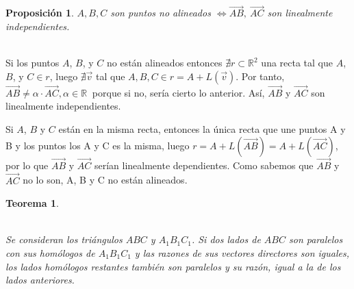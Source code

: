\documentclass[11pt, a4paper]{article}
\makeatletter
\newif\IfInSansMode
\let\oldsf\sffamily
\renewcommand*{\sffamily}{\oldsf\mathversion{sans}\InSansModetrue}
\let\oldnorm\normalfont
\renewcommand*{\normalfont}{\oldnorm\InSansModefalse\mathversion{normal}}
\renewenvironment{proof}[1][\proofname] {\vspace{-15pt}\par\pushQED{\qed}\normalfont\topsep6\p@\@plus6\p@\relax\trivlist\item[\hskip\labelsep\it#1\@addpunct{.}]\ignorespaces}{\popQED\endtrivlist\@endpefalse}
\renewcommand{\vec}{\overrightarrow}
\renewenvironment{proof}[1][\proofname] {\par\pushQED{\qed}\normalfont\topsep6\p@\@plus6\p@\relax\trivlist\item[\hskip\labelsep\itshape\sffamily#1\@addpunct{.}]\ignorespaces}{\popQED\endtrivlist\@endpefalse}
\theoremstyle{theorem-style}
\newtheorem{nth}{Teorema}[section]
\newtheorem{nprop}{Proposición}[section]
\theoremstyle{definition-style}
\theoremstyle{remark-style}
\theoremstyle{example-style}
\makeatother
\begin{document}
\begin{nprop}
  $A,B,C$ son puntos no alineados  $ \iff \overrightarrow{AB}, \ \overrightarrow{AC}$ son linealmente independientes.
\end{nprop}

  \begin {proof}\hfill\\
    \boxed{\Rightarrow}
    Si los puntos $A$, $B$, y $C$ no están alineados entonces $\nexists r \subset \mathbb{R}^2$ una recta tal que $A$, $B$, y $C \in r$, luego $\nexists \vec{v}$ tal que $A,B,C \in r = A + L(\vec{v})$. Por tanto, $\overrightarrow{AB} \neq \alpha \cdot \overrightarrow{AC}, \alpha \in \mathbb{R}\ $ porque si no, sería cierto lo anterior. Así, $\overrightarrow{AB}$ y $\overrightarrow{AC}$ son linealmente independientes.

    \boxed{\Leftarrow} Si $A$, $B$ y $C$ están en la misma recta, entonces la única recta que une puntos A y B y los puntos los A y C es la misma, luego $r = A + L(\overrightarrow{AB})  = A + L(\overrightarrow{AC})$, por lo que $\overrightarrow{AB}$ y $\overrightarrow{AC}$ serían linealmente dependientes. Como sabemos que $\overrightarrow{AB}$ y $\overrightarrow{AC}$ no lo son, A, B y C no están alineados.
  \end{proof}

\begin{nth}\hfill\\
\begin{minipage}[c]{0.50\textwidth}
  \hfill\\
  Se consideran los triángulos $ABC$ y $A_1B_1C_1$. Si dos lados de $ABC$ son paralelos con sus homólogos de $A_1B_1C_1$ y las razones de sus vectores directores son iguales, los lados homólogos restantes también son paralelos y su razón, igual a la de los lados anteriores.
\end{minipage}\hfill
\begin{minipage}[]{0.47\textwidth}
\end{minipage}

  \end{nth}
  
\end{document}
